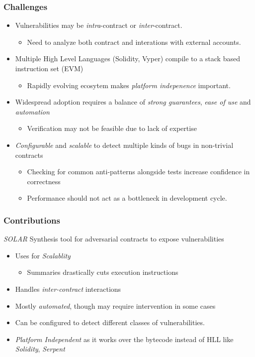 \documentclass{beamer}
\begin{document}
\begin{frame}
  \frametitle{Challenges}
  \begin{itemize}
    \item Vulnerabilities may be \textit{intra}-contract or
      \textit{inter}-contract.
      \begin{itemize}
        \item Need to analyze both contract and
          interations with external accounts.
      \end{itemize}
    \item Multiple High Level Languages (Solidity, Vyper) compile to a
      stack based instruction set (EVM)
      \begin{itemize}
        \item Rapidly evolving ecosytem makes \textit{platform indepenence}
          important.
      \end{itemize}
    \item Widespread adoption requires a balance of
      \textit{strong guarantees}, \textit{ease of use} and \textit{automation}
      \begin{itemize}
        \item Verification may not be feasible due to lack of expertise
      \end{itemize}
    \item \textit{Configurable} and \textit{scalable} to detect multiple kinds of bugs
      in non-trivial contracts
      \begin{itemize}
        \item Checking for common anti-patterns alongside
          tests increase confidence in correctness
        \item Performance should not act as a bottleneck
          in development cycle.
      \end{itemize}
  \end{itemize}
\end{frame}


\begin{frame}
  \frametitle{Contributions}
  \textit{SOLAR} Synthesis tool for adversarial contracts
  to expose vulnerabilities
  \begin{itemize}
    \item Uses  for \textit{Scalablity}
    \begin{itemize}
      \item Summaries drastically cuts execution instructions
    \end{itemize}
    \item Handles \textit{inter-contract} interactions
    \item Mostly \textit{automated}, though may require intervention
      in some cases
    \item Can be configured to detect different classes of vulnerabilities.
   \item \textit{Platform Independent} as it works over the bytecode
      instead of HLL like \textit{Solidity}, \textit{Serpent}
  \end{itemize}
\end{frame}
\end{document}
